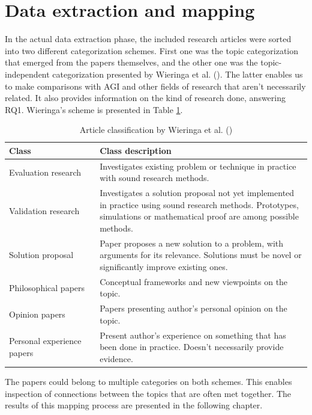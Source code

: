 \documentclass[utf8,english]{gradu3}
\begin{document}
\section{Data extraction and mapping}

In the actual data extraction phase, the included research articles were sorted
into two different categorization schemes. First one was the topic
categorization that emerged from the papers themselves, and the other one was
the topic-independent categorization presented by Wieringa et al.
(\cite*{wieringa2006}). The latter enables us to make comparisons with AGI and
other fields of research that aren't necessarily related. It also provides
information on the kind of research done, answering RQ1. Wieringa's scheme is
presented in Table \ref{table:wieringa}.

\begin{table}[H]
  \footnotesize
  \centering
  \begin{tabular}{p{0.30\linewidth} p{0.70\linewidth}}

    \textbf{Class}  & \textbf{Class description}  \\ \hline
    Evaluation research & Investigates existing problem or technique in practice with sound research methods. \\ \hline
    Validation research & Investigates a solution proposal not yet implemented in practice using sound research methods. Prototypes, simulations or mathematical proof are among possible methods. \\ \hline
    Solution proposal & Paper proposes a new solution to a problem, with arguments for its relevance. Solutions must be novel or significantly improve existing ones. \\ \hline
    Philosophical papers & Conceptual frameworks and new viewpoints on the topic. \\ \hline
    Opinion papers & Papers presenting author's personal opinion on the topic. \\ \hline
    Personal experience papers & Present author's experience on something that has been done in practice. Doesn't necessarily provide evidence. \\ \hline

  \end{tabular}
  \caption{Article classification by Wieringa et al. (\cite*{wieringa2006})}
  \label{table:wieringa}
\end{table}

The papers could belong to multiple categories on both schemes. This enables
inspection of connections between the topics that are often met together. The
results of this mapping process are presented in the following chapter.
\end{document}
